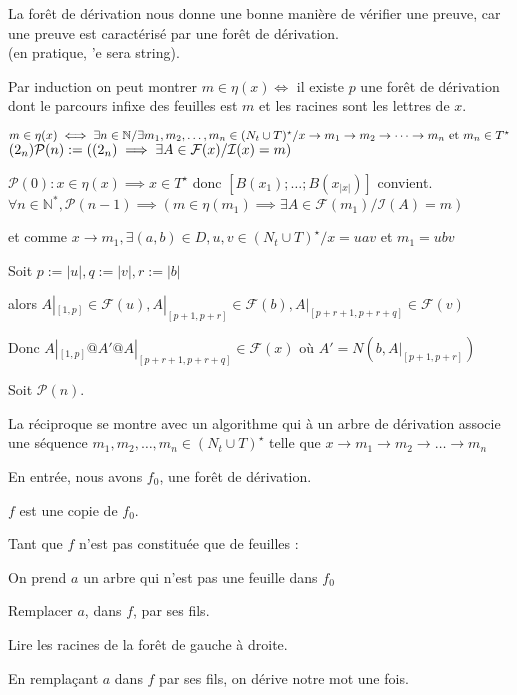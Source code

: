 \documentclass[a4paper,10pt]{article}
\newlength{\mydepth}
\newlength{\myheight}
\newenvironment{answer}%
{\par\begin{lrbox}{\mybox}\quad\begin{minipage}{\linewidth}\color{black}\setlength{\parskip}{10pt plus 1pt minus 1pt}\vspace*{-.7\baselineskip}}%
{\end{minipage}\end{lrbox}%
\settodepth{\mydepth}{\usebox{\mybox}}%
\settoheight{\myheight}{\usebox{\mybox}}%
\addtolength{\myheight}{\mydepth}%
\noindent\makebox[0pt]{%
  \color{gray}\hspace{-0pt}\rule[-\mydepth]{1pt}{\myheight}}%
  \usebox{\mybox}%
  }
\begin{document}
La forêt de dérivation nous donne une bonne manière de vérifier une preuve, car une preuve est caractérisé par une forêt de dérivation.\\

(en pratique, 'e sera string).

Par induction on peut montrer $m \in \eta(x) \iff $ il existe $p$ une forêt de dérivation dont le parcours infixe des feuilles est $m$ et les racines sont les lettres de $x$. 

\begin{answer} 
$
m \in \eta(x)\\
\iff \exists n \in \mathbb{N} / \exists m_1,m_2,\dots,m_n \in (N_t \cup T)^\star / x \rightarrow m_1 \rightarrow m_2 \rightarrow \dots \rightarrow m_n\text{ et }m_n \in T^\star$    $ (2_n)\\
\mathcal{P}(n) := ((2_n) \implies \exists A \in \mathcal{F}(x) / \mathcal{I}(x) = m)$\\
\begin{answer} 
$\mathcal{P}(0) : x \in \eta(x) \implies x \in T^\star$ donc $[B (x_1);\dots;B (x_{|x|})]$ convient.\\
$\forall n \in \mathbb{N}^*,\mathcal{P}(n-1) \implies (m \in \eta(m_1) \implies \exists A \in \mathcal{F}(m_1)/ \mathcal{I}(A) = m)$

 et comme $x\rightarrow m_1,\exists (a,b) \in D, u,v\in (N_t\cup T)^\star /x = uav$ et $m_1 = ubv$

 Soit $p := |u|, q := |v|, r := |b|$
 
 alors $A|_{[1,p]} \in \mathcal{F}(u), A|_{[p+1,p+r]} \in \mathcal{F}(b), A|_{[p+r+1,p+r+q]} \in \mathcal{F}(v)$

 Donc $A|_{[1,p]}@A'@A|_{[p+r+1,p+r+q]}\in \mathcal{F}(x)$ où $A' = N (b,A|_{[p+1,p+r]})$

 Soit $\mathcal{P}(n)$.
\end{answer}
\end{answer}
La réciproque se montre avec un algorithme qui à un arbre de dérivation associe une séquence $m_1,m_2,\dots,m_n \in (N_t \cup T)^\star$ telle que $x \rightarrow m_1 \rightarrow m_2 \rightarrow \dots \rightarrow m_n$

En entrée, nous avons $f_0$, une forêt de dérivation.
\begin{answer} 
$f$ est une copie de $f_0$. 

Tant que $f$ n'est pas constituée que de feuilles :

\begin{answer} 
    On prend $a$ un arbre qui n'est pas une feuille dans $f_0$

    Remplacer $a$, dans $f$, par ses fils.

    Lire les racines de la forêt de gauche à droite.
\end{answer}
\end{answer}
En remplaçant $a$ dans $f$ par ses fils, on dérive notre mot une fois.\\\\
\end{document}
